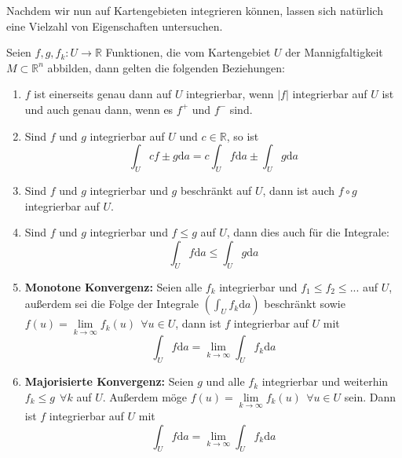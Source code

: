 Nachdem wir nun auf Kartengebieten integrieren können, 
lassen sich natürlich eine Vielzahl von Eigenschaften untersuchen. 

\begin{satz}
	Seien $f,g,f_k:U\rightarrow\mathbb{R}$ Funktionen, 
	die vom Kartengebiet $U$ der Mannigfaltigkeit $M\subset\mathbb{R}^n$ 
	abbilden, dann gelten die folgenden Beziehungen:
	\begin{enumerate}
		\item 	$f$ ist einerseits genau dann auf $U$ integrierbar, 
				wenn $|f|$ integrierbar auf $U$ ist und auch genau dann, 
				wenn es $f^+$ und $f^-$ sind.
		\item 	Sind $f$ und $g$ integrierbar auf $U$ und $c\in\mathbb{R}$, 
				so ist
				\begin{equation*}
					\int_Ucf\pm g\mathrm{d}a = 
					c\int_Uf\mathrm{d}a\pm\int_Ug\mathrm{d}a
				\end{equation*}
		\item 	Sind $f$ und $g$ integrierbar und $g$ beschränkt auf $U$, 
				dann ist auch $f\circ g$ integrierbar auf $U$.
		\item 	Sind $f$ und $g$ integrierbar und $f\leq g$ auf $U$, 
				dann dies auch für die Integrale:
				\begin{equation*}
					\int_Uf\mathrm{d}a\leq\int_Ug\mathrm{d}a
				\end{equation*}
		\item	\textbf{Monotone Konvergenz:} Seien alle $f_k$ 
				integrierbar und $f_1\leq f_2\leq ...$ auf $U$, 
				außerdem sei die Folge der Integrale $\left(\int_Uf_k\mathrm{d}a\right)$ 
				beschränkt sowie $f(u)=\lim\limits_{k\rightarrow\infty}f_k(u) \ \ \forall u\in U$, 
				dann ist $f$ integrierbar auf $U$ mit
				\begin{equation*}
					\int_Uf\mathrm{d}a = 
					\lim\limits_{k\rightarrow\infty}\int_Uf_k\mathrm{d}a
				\end{equation*}
		\item 	\textbf{Majorisierte Konvergenz:} Seien $g$ und alle $f_k$ 
				integrierbar und weiterhin $f_k\leq g \ \ \forall k$ auf $U$. 
				Außerdem möge $f(u) = \lim\limits_{k\rightarrow\infty}f_k(u) \ \ \forall u\in U$ 
				sein. Dann ist $f$ integrierbar auf $U$ mit
				\begin{equation*}
					\int_Uf\mathrm{d}a = 
					\lim\limits_{k\rightarrow\infty}\int_Uf_k\mathrm{d}a
				\end{equation*}
	\end{enumerate}
\end{satz}
